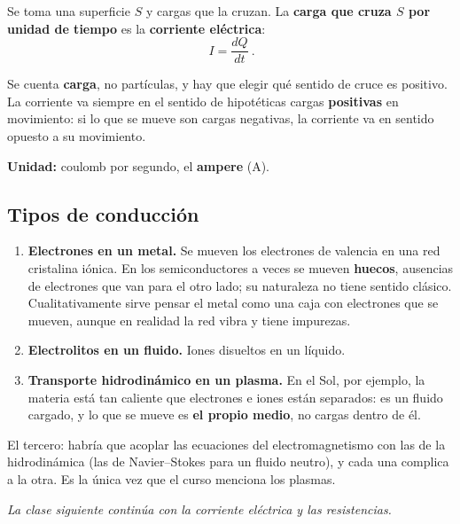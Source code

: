 \documentclass[12pt,a4paper]{article}
\begin{document}
Se toma una superficie $S$ y cargas que la cruzan. La \textbf{carga que cruza $S$
por unidad de tiempo} es la \textbf{corriente eléctrica}:
\[
\boxed{\ I = \frac{dQ}{dt}\ } .
\]

\begin{warnbox}
Se cuenta \textbf{carga}, no partículas, y hay que elegir qué sentido de cruce es
positivo. La corriente va siempre en el sentido de hipotéticas cargas
\textbf{positivas} en movimiento: si lo que se mueve son cargas negativas, la
corriente va en sentido opuesto a su movimiento.
\end{warnbox}

\textbf{Unidad:} coulomb por segundo, el \textbf{ampere} (A).

\subsection{Tipos de conducción}

\begin{enumerate}
  \item \textbf{Electrones en un metal.} Se mueven los electrones de valencia en
    una red cristalina iónica. En los semiconductores a veces se mueven
    \textbf{huecos}, ausencias de electrones que van para el otro lado; su
    naturaleza no tiene sentido clásico. Cualitativamente sirve pensar el metal
    como una caja con electrones que se mueven, aunque en realidad la red vibra y
    tiene impurezas.
  \item \textbf{Electrolitos en un fluido.} Iones disueltos en un líquido.
  \item \textbf{Transporte hidrodinámico en un plasma.} En el Sol, por ejemplo, la
    materia está tan caliente que electrones e iones están separados: es un fluido
    cargado, y lo que se mueve es \textbf{el propio medio}, no cargas dentro de
    él.
\end{enumerate}

\begin{notebox}
El tercero: habría que acoplar las ecuaciones del electromagnetismo con las de la
hidrodinámica (las de Navier--Stokes para un fluido neutro), y cada una complica a
la otra. Es la única vez que el curso menciona los plasmas.
\end{notebox}

\medskip
\noindent\emph{La clase siguiente continúa con la corriente eléctrica y las
resistencias.}
\end{document}
